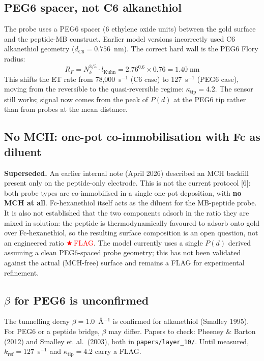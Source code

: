 \documentclass[10pt,a4paper]{article}
\numberwithin{equation}{section}
\newcommand{\cit}[1]{[#1]}
\newcommand{\FLAG}{\textcolor{red}{$\bigstar$\,FLAG}}
\begin{document}
\subsection{PEG6 spacer, not C6 alkanethiol}

The probe uses a PEG6 spacer (6 ethylene oxide units) between the gold surface
and the peptide-MB construct. Earlier model versions incorrectly used
C6 alkanethiol geometry ($d_{\text{C6}} = 0.756$~nm). The correct hard wall is
the PEG6 Flory radius:
\[
  R_F = N_k^{3/5} \cdot l_{\text{Kuhn}} = 2.76^{0.6} \times 0.76 = 1.40\;\text{nm}
\]
This shifts the ET rate from 78,000~s$^{-1}$ (C6 case) to 127~s$^{-1}$ (PEG6 case),
moving from the reversible to the quasi-reversible regime: $\kappa_{\text{tip}} = 4.2$.
The sensor still works; signal now comes from the peak of $P(d)$ at the PEG6 tip
rather than from probes at the mean distance.

\subsection{No MCH: one-pot co-immobilisation with Fc as diluent}

\textbf{Superseded.} An earlier internal note (April 2026) described an MCH
backfill present only on the peptide-only electrode. This is not the
current protocol \cit{6}: both probe types are co-immobilised in a single
one-pot deposition, with \textbf{no MCH at all}.
Fc-hexanethiol itself acts as the diluent for the MB-peptide probe. It is also
not established that the two components adsorb in the ratio they are mixed in
solution: the peptide is thermodynamically favoured to adsorb onto gold over
Fc-hexanethiol, so the resulting surface composition is an open question, not
an engineered ratio \FLAG. The model currently uses a single $P(d)$ derived
assuming a clean PEG6-spaced probe geometry; this has not been validated
against the actual (MCH-free) surface and remains a FLAG for experimental
refinement.

\subsection{$\beta$ for PEG6 is unconfirmed}

The tunnelling decay $\beta = 1.0$~\AA$^{-1}$ is confirmed for alkanethiol
(Smalley 1995). For PEG6 or a peptide bridge, $\beta$ may differ.
Papers to check: Pheeney \& Barton (2012) and Smalley et~al.\ (2003),
both in \texttt{papers/layer\_10/}. Until measured, $k_{\text{ref}} = 127$~s$^{-1}$
and $\kappa_{\text{tip}} = 4.2$ carry a FLAG.
\end{document}

